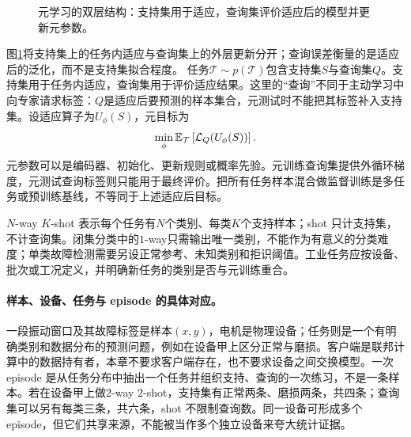 \begin{figure}[htbp]
\centering
{}
\caption{元学习的双层结构：支持集用于适应，查询集评价适应后的模型并更新元参数。}
\label{fig:meta-support-query}
\end{figure}
图\ref{fig:meta-support-query}将支持集上的任务内适应与查询集上的外层更新分开；查询误差衡量的是适应后的泛化，而不是支持集拟合程度。
任务$\mathcal T\sim p(\mathcal T)$包含支持集$S$与查询集$Q$。支持集用于任务内适应，查询集用于评价适应结果。这里的“查询”不同于主动学习中向专家请求标签：$Q$是适应后要预测的样本集合，元测试时不能把其标签补入支持集。设适应算子为$U_\phi(S)$，元目标为
\begin{equation}
 \min_\phi\mathbb{E}_{\mathcal T}\left[\mathcal L_Q(U_\phi(S))\right].
\end{equation}
元参数可以是编码器、初始化、更新规则或概率先验\cite{hospedales2022meta}。元训练查询集提供外循环梯度，元测试查询标签则只能用于最终评价。把所有任务样本混合做监督训练是多任务或预训练基线，不等同于上述适应后目标。

$N$-way $K$-shot 表示每个任务有$N$个类别、每类$K$个支持样本；shot 只计支持集，不计查询集。闭集分类中的$1$-way只需输出唯一类别，不能作为有意义的分类难度；单类故障检测需要另设正常参考、未知类别和拒识阈值。工业任务应按设备、批次或工况定义，并明确新任务的类别是否与元训练重合。

\paragraph{样本、设备、任务与 episode 的具体对应。}
一段振动窗口及其故障标签是样本$(x,y)$，电机是物理设备；任务则是一个有明确类别和数据分布的预测问题，例如在设备甲上区分正常与磨损。客户端是联邦计算中的数据持有者，本章不要求客户端存在，也不要求设备之间交换模型。一次 episode 是从任务分布中抽出一个任务并组织支持、查询的一次练习，不是一条样本。若在设备甲上做$2$-way $2$-shot，支持集有正常两条、磨损两条，共四条；查询集可以另有每类三条，共六条，shot 不限制查询数。同一设备可形成多个 episode，但它们共享来源，不能被当作多个独立设备来夸大统计证据。

